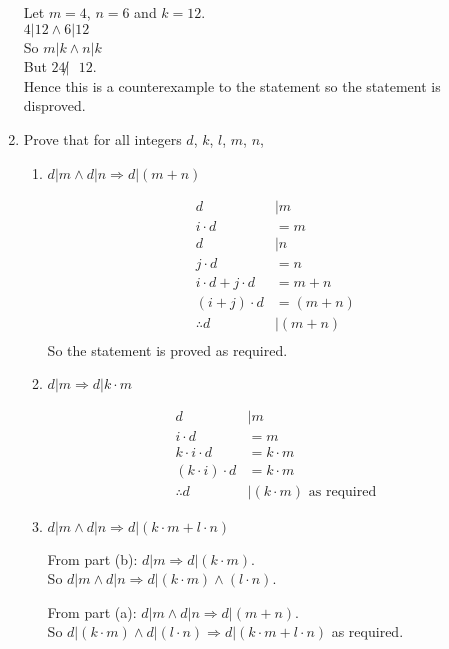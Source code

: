 \documentclass[10pt,\jkfside,a4paper]{article}
\begin{document}
\begin{enumerate}
Let $m = 4$, $n = 6$ and $k = 12$.\\
$4 | 12 \wedge 6 | 12$\\
So $m | k \wedge n | k$\\
But $24 \not| \text{ }12$.\\
Hence this is a counterexample to the statement so the statement is disproved.

\item Prove that for all integers $d$, $k$, $l$, $m$, $n$,

\begin{enumerate}

\item $d|m \wedge d|n \Longrightarrow d|(m + n)$

\begin{equation}
\begin{split}
d &| m \\
i\cdot d &= m\\
d &| n\\
j\cdot d &= n\\
i\cdot d + j\cdot d &= m + n\\
(i + j)\cdot d &= (m + n)\\
\therefore d &| (m + n)\\
\end{split}
\end{equation}
So the statement is proved as required.

\item $d|m \Longrightarrow d|k\cdot m$

\begin{equation}
\begin{split}
d &| m\\
i\cdot d &= m\\
k\cdot i\cdot d &= k\cdot m\\
(k\cdot i)\cdot d &= k\cdot m\\
\therefore d&|(k\cdot m) \text{ as required}
\end{split}
\end{equation}

\item $d|m \wedge d|n \Longrightarrow d|(k\cdot m + l\cdot n)$

From part (b): $d|m \Longrightarrow d|(k\cdot m)$.\\
So $d|m \wedge d|n \Longrightarrow d|(k\cdot m) \wedge (l\cdot n)$.

From part (a): $d|m \wedge d|n \Longrightarrow d|(m+n)$.\\
So $d|(k\cdot m) \wedge d|(l\cdot n) \Longrightarrow d|(k\cdot m + l\cdot n)$ as required.


\end{enumerate}
\end{enumerate}
\end{document}
